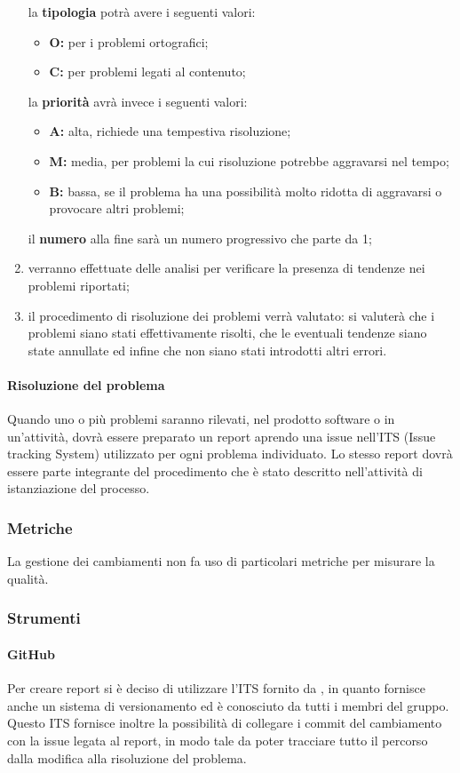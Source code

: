 \begin{enumerate}
				 la \textbf{tipologia} potrà avere i seguenti valori:
					\begin{itemize}
						\item \textbf{O:} per i problemi ortografici;
						\item \textbf{C:} per problemi legati al contenuto;
					\end{itemize}
				 la \textbf{priorità} avrà invece i seguenti valori:
					\begin{itemize}
					 	\item \textbf{A:} alta, richiede una tempestiva risoluzione;
					 	\item \textbf{M:} media, per problemi la cui risoluzione potrebbe aggravarsi nel tempo;
					 	\item \textbf{B:} bassa, se il problema ha una possibilità molto ridotta di aggravarsi o provocare altri problemi;
					 \end{itemize}
				 il \textbf{numero} alla fine sarà un numero progressivo che parte da 1;

				\item verranno effettuate delle analisi per verificare la presenza di tendenze nei problemi riportati;

				\item il procedimento di risoluzione dei problemi verrà valutato: si valuterà che i problemi siano stati effettivamente risolti, che le eventuali tendenze siano state annullate ed infine che non siano stati introdotti altri errori.
			\end{enumerate}
		\paragraph{Risoluzione del problema}
			Quando uno o più problemi saranno rilevati, nel prodotto software o in un'attività, dovrà essere preparato un report aprendo una issue nell'ITS (Issue tracking System) utilizzato per ogni problema individuato. Lo stesso report dovrà essere parte integrante del procedimento che è stato descritto nell'attività di istanziazione del processo.
	\subsubsection{Metriche}
		La gestione dei cambiamenti non fa uso di particolari metriche per misurare la qualità.
	\subsubsection{Strumenti}
		\paragraph{GitHub}
			Per creare report si è deciso di utilizzare l'ITS fornito da , in quanto fornisce anche un sistema di versionamento ed è conosciuto da tutti i membri del gruppo.
			Questo ITS fornisce inoltre la possibilità di collegare i commit del cambiamento con la issue legata al report, in modo tale da poter tracciare tutto il percorso dalla modifica alla risoluzione del problema.

